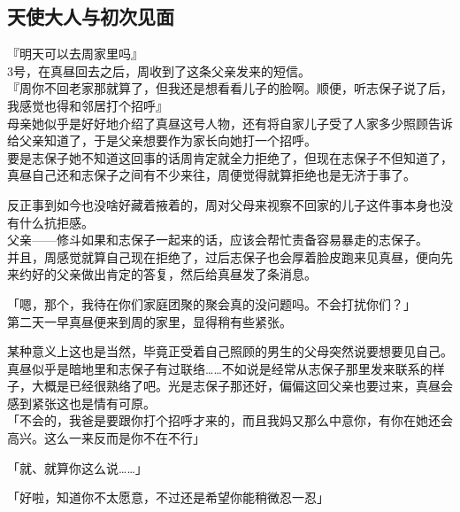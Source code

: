 \subsection{天使大人与初次见面}

『明天可以去周家里吗』\\

3号，在真昼回去之后，周收到了这条父亲发来的短信。\\

『周你不回老家那就算了，但我还是想看看儿子的脸啊。顺便，听志保子说了后，我感觉也得和邻居打个招呼』\\

母亲她似乎是好好地介绍了真昼这号人物，还有将自家儿子受了人家多少照顾告诉给父亲知道了，于是父亲想要作为家长向她打一个招呼。\\

要是志保子她不知道这回事的话周肯定就全力拒绝了，但现在志保子不但知道了，真昼自己还和志保子之间有不少来往，周便觉得就算拒绝也是无济于事了。

反正事到如今也没啥好藏着掖着的，周对父母来视察不回家的儿子这件事本身也没有什么抗拒感。\\

父亲——修斗如果和志保子一起来的话，应该会帮忙责备容易暴走的志保子。\\

并且，周感觉就算自己现在拒绝了，过后志保子也会厚着脸皮跑来见真昼，便向先来约好的父亲做出肯定的答复，然后给真昼发了条消息。\\

\vspace{2\baselineskip}

「嗯，那个，我待在你们家庭团聚的聚会真的没问题吗。不会打扰你们？」\\

第二天一早真昼便来到周的家里，显得稍有些紧张。

某种意义上这也是当然，毕竟正受着自己照顾的男生的父母突然说要想要见自己。\\

真昼似乎是暗地里和志保子有过联络……不如说是经常从志保子那里发来联系的样子，大概是已经很熟络了吧。光是志保子那还好，偏偏这回父亲也要过来，真昼会感到紧张这也是情有可原。\\

「不会的，我爸是要跟你打个招呼才来的，而且我妈又那么中意你，有你在她还会高兴。这么一来反而是你不在不行」%

「就、就算你这么说……」

「好啦，知道你不太愿意，不过还是希望你能稍微忍一忍」\\

